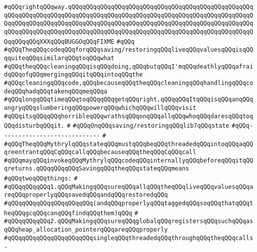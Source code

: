 \verb|#qQQqrightqQQqway.qQQqqQQqqQQqqQQqqQQqqQQqqQQqqQQqqQQqqQQqqQQqqQQqqQQqqQQqqQQqqQQqqQQqqQQqqQQqqQQqqQQqqQQqqQQqqQQqqQQqqQQqqQQqqQQqqQQqqQQqqQQqqQQqqQQqqQQqqQQqqQQqqQQqqQQqqQQqqQQqqQQqqQQqqQQqqQQqqQQqqQQqqQQqqQQqqQQqqQQqqQQqqQQqqQQqqQQqqQQqqQQqqQQqqQQqqQQqqQQqqQQqqQQqqQQqqQQqqQQqqQQqqQQqqQQqXXXqQQqBUGGOqQQqFIXME|\newline
\verb|#qQQq|\newline
\verb|#qQQqTheqQQqcodeqQQqforqQQqsaving/restoringqQQqliveqQQqvaluesqQQqisqQQqquiteqQQqsimilarqQQqtoqQQqwhat|\newline
\verb|#qQQqtheqQQqcleaningqQQqisqQQqdoing,qQQqbutqQQqI'mqQQqdeathlyqQQqafraidqQQqofqQQqmergingqQQqitqQQqintoqQQqthe|\newline
\verb|#qQQqcleaningqQQqcode,qQQqbecauseqQQqtheqQQqcleaningqQQqhandlingqQQqcodeqQQqhadqQQqtakenqQQqmeqQQqa|\newline
\verb|#qQQqlongqQQqtimeqQQqtoqQQqqQQqgetqQQqright.qQQqqQQqItqQQqisqQQqanqQQqangryqQQqslumberingqQQqpowerqQQqwhichqQQqwillqQQqvisit|\newline
\verb|#qQQqitsqQQqqQQqhorribleqQQqwrathsqQQqonqQQqallqQQqwhoqQQqdaresqQQqtoqQQqdisturbqQQqit.|\newline
\verb|#|\newline
\verb|#qQQqOnqQQqsaving/restoringqQQqlib7qQQqstate|\newline
\verb|#qQQq----------------------------|\newline
\verb|#|\newline
\verb|#qQQqTheqQQqMythrylqQQqstateqQQqmustqQQqbeqQQqthreadedqQQqintoqQQqaqQQqreentrantqQQqCqQQqcallqQQqbecauseqQQqtheqQQqCqQQqcall|\newline
\verb|#qQQqmayqQQqinvokeqQQqMythrylqQQqcodeqQQqinternallyqQQqbeforeqQQqitqQQqreturns.qQQqqQQqqQQqSavingqQQqtheqQQqstateqQQqmeans|\newline
\verb|#qQQqtwoqQQqthings:|\newline
\verb|#|\newline
\verb|#qQQqqQQqqQQq1.qQQqMakingqQQqsureqQQqallqQQqtheqQQqliveqQQqvaluesqQQqareqQQqproperlyqQQqsavedqQQqandqQQqrestoredqQQq|\newline
\verb|#qQQqqQQqqQQqqQQqqQQqqQQq(andqQQqproperlyqQQqtaggedqQQqsoqQQqthatqQQqtheqQQqgcqQQqcanqQQqfindqQQqthem)qQQq|\newline
\verb|#|\newline
\verb|#qQQqqQQqqQQq2.qQQqMakingqQQqsureqQQqglobalqQQqregistersqQQqsuchqQQqasqQQqheap_allocation_pointerqQQqareqQQqproperly|\newline
\verb|#qQQqqQQqqQQqqQQqqQQqqQQqsingleqQQqthreadedqQQqthroughqQQqtheqQQqcalls.|\newline
